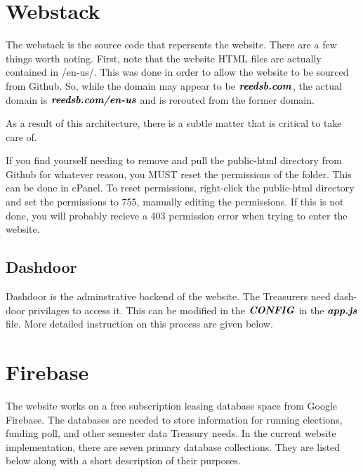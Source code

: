 \documentclass[a4paper]{article}
\begin{document}
\newpage
\section{Webstack}

The webstack is the source code that repersents the website. There are a few things worth noting. First, note that the website HTML files are actually contained in /en-us/. This was done in order to allow the website to be sourced from Github. So, while the domain may appear to be $\textbf{\textit{reedsb.com}}$, the actual domain is $\textbf{\textit{reedsb.com/en-us}}$ and is rerouted from the former domain.

As a result of this architecture, there is a subtle matter that is critical to take care of.

\begin{warning*}
If you find yourself needing to remove and pull the public-html directory from Github for whatever reason, you MUST reset the permissions of the folder. This can be done in cPanel. To reset permissions, right-click the public-html directory and set the permissions to 755, manually editing the permissions. If this is not done, you will probably recieve a 403 permission error when trying to enter the website.
\end{warning*}

\subsection{Dashdoor}
Dashdoor is the adminstrative backend of the website. The Treasurers need dash-door privilages to access it. This can be modified in the $\textbf{\textit{CONFIG}}$ in the $\textbf{\textit{app.js}}$ file. More detailed instruction on this process are given below.


\newpage
\section{Firebase}

The website works on a free subscription leasing database space from Google Firebase. The databases are needed to store information for
running elections, funding poll, and other semester data Treasury needs. In the current website implementation, there are seven primary database collections. They are listed below along with a short description of their purposes.
\end{document}
